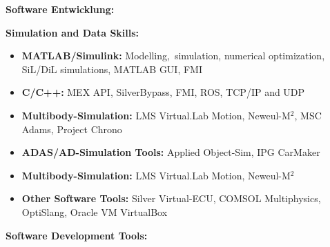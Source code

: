 \documentclass{mycv}
\begin{document}
\begin{paracol}{2}
{        {\bfseries Software Entwicklung:}\par
    }
    {
        {\bfseries Simulation and Data Skills:}
        \begin{itemize}
            \item {\bfseries MATLAB/Simulink:} Modelling, \,simulation,
                numerical optimization, SiL/DiL simulations, MATLAB GUI, FMI
            \item {\bfseries C/C++:} MEX API, SilverBypass, FMI, ROS, TCP/IP and UDP
            \item{\bfseries Multibody-Simulation:}  LMS Virtual.Lab Motion, Neweul-M$^2$, 
                MSC Adams, Project Chrono
            \item{\bfseries ADAS/AD-Simulation Tools:}  Applied Object-Sim, IPG CarMaker
            \item{\bfseries Multibody-Simulation:}  LMS Virtual.Lab Motion, Neweul-M$^2$
            \item {\bfseries Other Software Tools:}  Silver Virtual-ECU, COMSOL
                Multiphysics, OptiSlang, Oracle VM VirtualBox
        \end{itemize} \par

        {\bfseries Software Development Tools:}\par
    }


\end{paracol}
\end{document}
